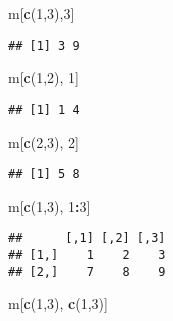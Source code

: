 \documentclass[
]{article}
\newenvironment{Shaded}{\begin{snugshade}}{\end{snugshade}}
\newcommand{\DecValTok}[1]{\textcolor[rgb]{0.00,0.00,0.81}{#1}}
\newcommand{\KeywordTok}[1]{\textcolor[rgb]{0.13,0.29,0.53}{\textbf{#1}}}
\newcommand{\NormalTok}[1]{#1}
\newcommand{\OperatorTok}[1]{\textcolor[rgb]{0.81,0.36,0.00}{\textbf{#1}}}
\begin{document}
\begin{Shaded}
\begin{Highlighting}[]
\NormalTok{m[}\KeywordTok{c}\NormalTok{(}\DecValTok{1}\NormalTok{,}\DecValTok{3}\NormalTok{),}\DecValTok{3}\NormalTok{]}
\end{Highlighting}
\end{Shaded}

\begin{verbatim}
## [1] 3 9
\end{verbatim}

\begin{Shaded}
\begin{Highlighting}[]
\NormalTok{m[}\KeywordTok{c}\NormalTok{(}\DecValTok{1}\NormalTok{,}\DecValTok{2}\NormalTok{), }\DecValTok{1}\NormalTok{]}
\end{Highlighting}
\end{Shaded}

\begin{verbatim}
## [1] 1 4
\end{verbatim}

\begin{Shaded}
\begin{Highlighting}[]
\NormalTok{m[}\KeywordTok{c}\NormalTok{(}\DecValTok{2}\NormalTok{,}\DecValTok{3}\NormalTok{), }\DecValTok{2}\NormalTok{]}
\end{Highlighting}
\end{Shaded}

\begin{verbatim}
## [1] 5 8
\end{verbatim}

\begin{Shaded}
\begin{Highlighting}[]
\NormalTok{m[}\KeywordTok{c}\NormalTok{(}\DecValTok{1}\NormalTok{,}\DecValTok{3}\NormalTok{), }\DecValTok{1}\OperatorTok{:}\DecValTok{3}\NormalTok{]}
\end{Highlighting}
\end{Shaded}

\begin{verbatim}
##      [,1] [,2] [,3]
## [1,]    1    2    3
## [2,]    7    8    9
\end{verbatim}

\begin{Shaded}
\begin{Highlighting}[]
\NormalTok{m[}\KeywordTok{c}\NormalTok{(}\DecValTok{1}\NormalTok{,}\DecValTok{3}\NormalTok{), }\KeywordTok{c}\NormalTok{(}\DecValTok{1}\NormalTok{,}\DecValTok{3}\NormalTok{)]}
\end{Highlighting}
\end{Shaded}
\end{document}
